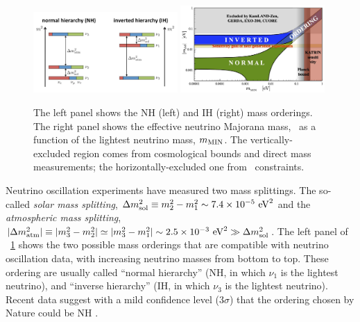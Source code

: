 \begin{figure}[h!]
\centering
\includegraphics[width=0.49\textwidth]{img2/mass-hierarchy-jgu-mainz-web.jpg} \hfill
\includegraphics[width=0.49\textwidth]{img2/APPECbetabetameff.jpg}
\caption{\small The left panel shows the NH (left) and IH (right) mass orderings. 
The right panel \cite{Giuliani:2019uno} shows the effective neutrino Majorana mass, \mbb\, as a function of the lightest neutrino mass, $m_{\rm MIN}$.
The vertically-excluded region comes from cosmological bounds and direct mass measurements; the horizontally-excluded one from \bbonu\ constraints.} \label{fig:numass_ordering}
\end{figure}

\indent

Neutrino oscillation experiments have measured two mass splittings. The so-called \emph{solar mass splitting}, $\Delta m^2_{ \rm sol}\equiv m^2_2-m^2_1\sim 7.4 \times
10^{-5}\ {\rm eV}^2$ and the
\emph{atmospheric mass splitting}, $|\Delta m^2_{\rm
atm}|\equiv |m^2_3-m^2_2|\simeq|m^2_3-m^2_1| \sim 2.5 \times 10^{-3}\ {\rm
eV}^2\gg \Delta m^2_{\rm sol}$. The left panel of \fig~\ref{fig:numass_ordering} shows the two possible mass orderings that are compatible with neutrino oscillation data, with increasing neutrino masses from bottom to top. These ordering are usually called ``normal hierarchy'' (NH, in which $\nu_1$ is the lightest neutrino), and
``inverse hierarchy'' (IH, in which $\nu_3$ is the lightest neutrino). Recent data suggest with a mild confidence level (3$\sigma$) that the ordering chosen by Nature could be NH \cite{deSalas:2018bym}.

